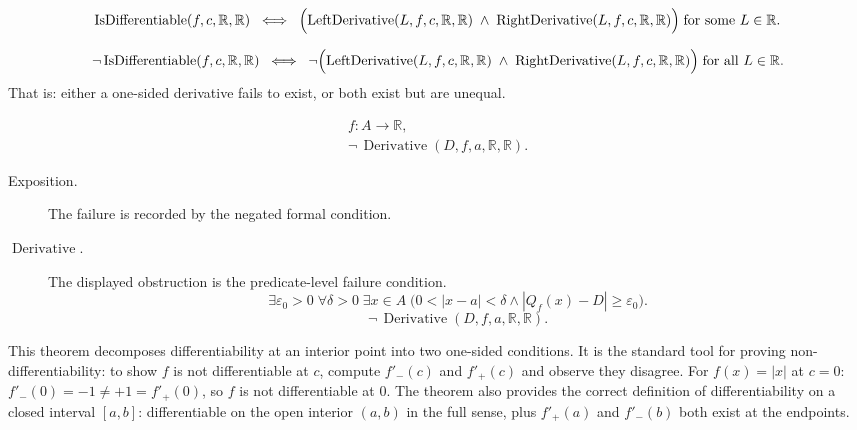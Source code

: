 \begin{remark*}
\[
\operatorname{IsDifferentiable}(f,c,\mathbb{R},\mathbb{R})
\;\iff\;
\Bigl(\operatorname{LeftDerivative}(L,f,c,\mathbb{R},\mathbb{R}) \;\land\; \operatorname{RightDerivative}(L,f,c,\mathbb{R},\mathbb{R})\Bigr)
\;\text{for some } L \in \mathbb{R}.
\]
\end{remark*}

\begin{remark*}
\[
\lnot\operatorname{IsDifferentiable}(f,c,\mathbb{R},\mathbb{R})
\;\iff\;
\lnot\Bigl(\operatorname{LeftDerivative}(L,f,c,\mathbb{R},\mathbb{R}) \;\land\; \operatorname{RightDerivative}(L,f,c,\mathbb{R},\mathbb{R})\Bigr)
\;\text{for all } L \in \mathbb{R}.
\]
That is: either a one-sided derivative fails to exist, or both exist but are unequal.
\end{remark*}

\begin{remark*}
\[
\begin{aligned}
  f\colon A\to\mathbb{R},\\
\neg\,\operatorname{Derivative}(D,f,a,\mathbb{R},\mathbb{R}).
\end{aligned}
\]
\end{remark*}

\begin{remark*}
\begin{description}
  \item[Exposition.]
  The failure is recorded by the negated formal condition.

  \item[\(\operatorname{Derivative}.\)]
  The displayed obstruction is the predicate-level failure condition.
  \[
  \exists\varepsilon_0>0\;\forall\delta>0\;\exists x\in A\;\bigl(0<|x-a|<\delta\land |Q_f(x)-D|\ge\varepsilon_0\bigr).
  \]
  \[
  \neg\,\operatorname{Derivative}(D,f,a,\mathbb{R},\mathbb{R}).
  \]
\end{description}
\end{remark*}



\begin{remark*}[Interpretation]
This theorem decomposes differentiability at an interior point into two one-sided conditions. It is the standard tool for proving non-differentiability: to show $f$ is not differentiable at $c$, compute $f'_-(c)$ and $f'_+(c)$ and observe they disagree. For $f(x) = |x|$ at $c = 0$: $f'_-(0) = -1 \neq +1 = f'_+(0)$, so $f$ is not differentiable at $0$. The theorem also provides the correct definition of differentiability on a closed interval $[a,b]$: differentiable on the open interior $(a,b)$ in the full sense, plus $f'_+(a)$ and $f'_-(b)$ both exist at the endpoints.
\end{remark*}


